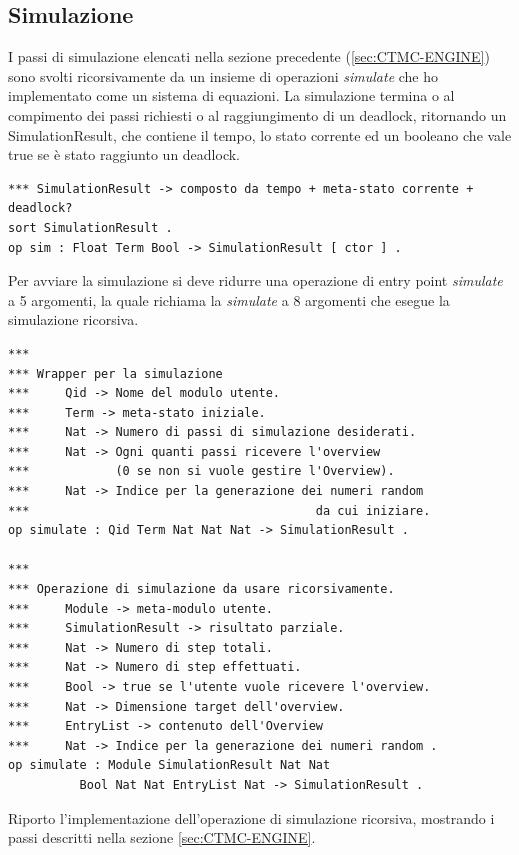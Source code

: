 \subsection{Simulazione}

I passi di simulazione elencati nella sezione precedente (\ref{sec:CTMC-ENGINE})
sono svolti ricorsivamente da un insieme di operazioni \emph{simulate} che ho
implementato come un sistema di equazioni. La simulazione termina o al
compimento dei passi richiesti o al raggiungimento di un deadlock, ritornando un
SimulationResult, che contiene il tempo, lo stato corrente ed un booleano che
vale true se è stato raggiunto un deadlock.
\begin{Verbatim}[fontsize=\small]
*** SimulationResult -> composto da tempo + meta-stato corrente + deadlock?
sort SimulationResult .
op sim : Float Term Bool -> SimulationResult [ ctor ] .
\end{Verbatim}

Per avviare la simulazione si deve ridurre una operazione di entry point
\emph{simulate} a 5 argomenti, la quale richiama la \emph{simulate} a 8
argomenti che esegue la simulazione ricorsiva.
\begin{Verbatim}[fontsize=\small]
***
*** Wrapper per la simulazione
***     Qid -> Nome del modulo utente.
***     Term -> meta-stato iniziale.
***     Nat -> Numero di passi di simulazione desiderati.
***     Nat -> Ogni quanti passi ricevere l'overview
***            (0 se non si vuole gestire l'Overview).
***     Nat -> Indice per la generazione dei numeri random
***                                        da cui iniziare.
op simulate : Qid Term Nat Nat Nat -> SimulationResult .
	
***
*** Operazione di simulazione da usare ricorsivamente.
***     Module -> meta-modulo utente.
***     SimulationResult -> risultato parziale.
*** 	Nat -> Numero di step totali.
***		Nat -> Numero di step effettuati.
***     Bool -> true se l'utente vuole ricevere l'overview.
***     Nat -> Dimensione target dell'overview.
***     EntryList -> contenuto dell'Overview
***     Nat -> Indice per la generazione dei numeri random .
op simulate : Module SimulationResult Nat Nat
          Bool Nat Nat EntryList Nat -> SimulationResult .
\end{Verbatim}

Riporto l'implementazione dell'operazione di simulazione ricorsiva, mostrando i
passi descritti nella sezione \ref{sec:CTMC-ENGINE}.

